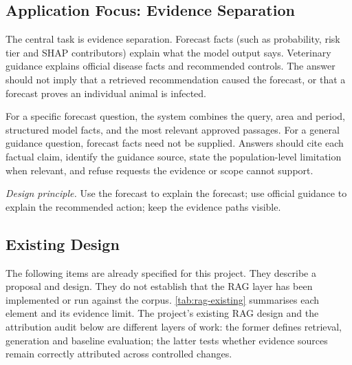 \documentclass[10pt,openany]{report}
\begin{document}
\subsection{Application Focus: Evidence Separation}

The central task is evidence separation. Forecast facts (such as probability, risk tier and SHAP
contributors) explain what the model output says. Veterinary guidance explains official disease facts
and recommended controls. The answer should not imply that a retrieved recommendation caused the
forecast, or that a forecast proves an individual animal is infected.

For a specific forecast question, the system combines the query, area and period, structured model
facts, and the most relevant approved passages. For a general guidance question, forecast facts need
not be supplied. Answers should cite each factual claim, identify the guidance source, state the
population-level limitation when relevant, and refuse requests the evidence or scope cannot support.

\noindent\textit{Design principle.} Use the forecast to explain the forecast; use official guidance to
explain the recommended action; keep the evidence paths visible.

\subsection{Existing Design}

The following items are already specified for this project. They describe a proposal and design.
They do not establish that the RAG layer has been implemented or run against the corpus.
\cref{tab:rag-existing} summarises each element and its evidence limit. The project's existing RAG
design and the attribution audit below are different layers of work: the former defines retrieval,
generation and baseline evaluation; the latter tests whether evidence sources remain correctly
attributed across controlled changes.
\end{document}
